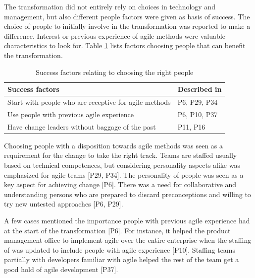 The transformation did not entirely rely on choices in technology and
management, but also different people factors were given as basis of success.
The choice of people to initially involve in the transformation was reported to
make a difference. Interest or previous experience of agile methods were
valuable characteristics to look for.
Table \ref{table:success_people} lists factors choosing people that can benefit
the transformation.

\begin{table}[h]
    \centering
    \begin{tabular}{ ll }
        \toprule
        Success factors  &  Described in \\
        \midrule
        Start with people who are receptive for agile methods  &
                P6, P29, P34  \\
        Use people with previous agile experience  &
                P6, P10, P37  \\
        Have change leaders without baggage of the past  &
                P11, P16  \\
        \bottomrule
    \end{tabular}
    \caption{Success factors relating to choosing the right people}
    \label{table:success_people}
\end{table}

Choosing people with a disposition towards agile methods was seen as a
requirement for the change to take the right track. Teams are staffed usually
based on technical competences, but considering personality aspects alike was
emphasized for agile teams [P29, P34]. The personality of people was seen as a
key aspect for achieving change [P6]. There was a need for collaborative and
understanding persons who are prepared to discard preconceptions and willing to
try new untested approaches [P6, P29].


A few cases mentioned the importance people with previous agile experience had
at the start of the transformation [P6]. For instance, it helped the product
management office to implement agile over the entire enterprise when the
staffing of was updated to include people with agile experience [P10]. Staffing
teams partially with developers familiar with agile helped the rest of the team
get a good hold of agile development [P37].

